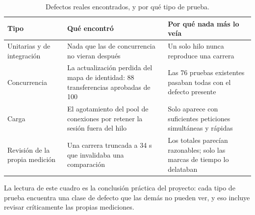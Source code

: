 \begin{table}[htbp]
\centering
\caption{Defectos reales encontrados, y por qué tipo de prueba.}
\label{tab:hallazgos}
\small
\begin{tabularx}{\textwidth}{@{}lXX@{}}
\toprule
\textbf{Tipo} & \textbf{Qué encontró} & \textbf{Por qué nada más lo veía} \\
\midrule
Unitarias y de integración & Nada que las de concurrencia no vieran después &
  Un solo hilo nunca reproduce una carrera \\
Concurrencia & La actualización perdida del mapa de identidad: 88
  transferencias aprobadas de 100 &
  Las 76 pruebas existentes pasaban todas con el defecto presente \\
Carga & El agotamiento del pool de conexiones por retener la sesión fuera del
  hilo & Solo aparece con suficientes peticiones simultáneas y rápidas \\
Revisión de la propia medición & Una carrera truncada a 34 s que invalidaba
  una comparación & Los totales parecían razonables; solo las marcas de
  tiempo lo delataban \\
\bottomrule
\end{tabularx}
\end{table}

La lectura de este cuadro es la conclusión práctica del proyecto: cada tipo de
prueba encuentra una clase de defecto que las demás no pueden ver, y eso
incluye revisar críticamente las propias mediciones.
